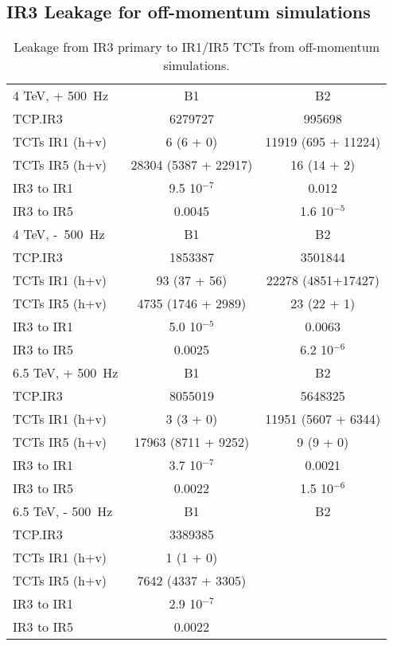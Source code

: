 \subsection{IR3 Leakage for off-momentum simulations}
\begin{table}[!h]
   \centering
   \caption{Leakage from IR3 primary to IR1/IR5 TCTs from off-momentum simulations.}

   \begin{tabular}{l|c|c}
       \hline
       4 TeV, + 500~Hz  & B1 & B2\\
       TCP.IR3  & 6279727 & 995698  \\
       TCTs IR1 (h+v) & 6 (6 + 0) & 11919 (695 + 11224) \\
       TCTs IR5 (h+v) & 28304 (5387 + 22917) & 16 (14 + 2) \\
       IR3 to IR1 & 9.5 10$^{-7}$ & 0.012 \\
       IR3 to IR5 & 0.0045 & 1.6 10$^{-5}$ \\
       \hline
       4 TeV, -~500~Hz  & B1 & B2\\
       TCP.IR3  & 1853387 & 3501844 \\
       TCTs IR1 (h+v) & 93 (37 + 56) & 22278 (4851+17427) \\
       TCTs IR5 (h+v) &  4735 (1746 + 2989) & 23 (22 + 1) \\
       IR3 to IR1 & 5.0 10$^{-5}$ & 0.0063 \\
       IR3 to IR5 & 0.0025 & 6.2 10$^{-6}$ \\
       \hline

       6.5 TeV, + 500~Hz  & B1 & B2\\
       TCP.IR3  & 8055019 & 5648325  \\
       TCTs IR1 (h+v) & 3 (3 + 0) & 11951 (5607 + 6344) \\
       TCTs IR5 (h+v) & 17963 (8711 + 9252) & 9 (9 + 0)\\
       IR3 to IR1 & 3.7 10$^{-7}$ & 0.0021 \\
       IR3 to IR5 & 0.0022 & 1.5 10$^{-6}$ \\
       \hline
       6.5 TeV, - 500~Hz  & B1 & B2\\
       TCP.IR3  &  3389385 &   \\
       TCTs IR1 (h+v) &  1 (1 + 0) &   \\
       TCTs IR5 (h+v) &  7642 (4337 + 3305) &  \\
       IR3 to IR1 &  2.9 10$^{-7}$ &  \\
       IR3 to IR5 &  0.0022 &   \\
       \hline

   \end{tabular}
   \label{leakageFactorsIR3}
\end{table}



